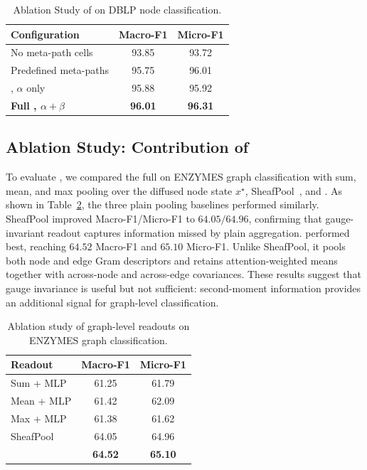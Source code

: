\begin{table}[t]
  \centering
  \caption{Ablation Study of \ampss{} on DBLP node classification.}
  \label{tab:ablation-schema}
  \small
  \begin{tabular}{lcc}
    \toprule
    \textbf{Configuration} & Macro-F1 & Micro-F1 \\
    \midrule
    No meta-path cells & 93.85 & 93.72 \\
    Predefined meta-paths & 95.75 & 96.01 \\
    \ampss{}, $\alpha$ only & 95.88 & 95.92 \\
    \textbf{Full \ampss{}, $\alpha+\beta$} & \textbf{96.01} & \textbf{96.31} \\
    \bottomrule
  \end{tabular}
\end{table}

\subsection{Ablation Study: Contribution of {\sheafcovpool{}}}

To evaluate \sheafcovpool{}, we compared the full \method{} on ENZYMES graph classification with sum, mean, and max pooling over the diffused node state \(x^\star\), SheafPool~\cite{braithwaite2024heterogeneous}, and \sheafcovpool{}. As shown in Table~\ref{tab:ablation-pooling}, the three plain pooling baselines performed similarly. SheafPool improved Macro-F1/Micro-F1 to \(64.05/64.96\), confirming that gauge-invariant readout captures information missed by plain aggregation. \sheafcovpool{} performed best, reaching \(64.52\) Macro-F1 and \(65.10\) Micro-F1. Unlike SheafPool, it pools both node and edge Gram descriptors and retains attention-weighted means together with across-node and across-edge covariances. These results suggest that gauge invariance is useful but not sufficient: second-moment information provides an additional signal for graph-level classification.

\begin{table}[t]
  \centering
  \caption{Ablation study of graph-level readouts on ENZYMES graph classification.}
  \label{tab:ablation-pooling}
  \small
  \begin{tabular}{lcc}
    \toprule
    \textbf{Readout} & Macro-F1 & Micro-F1 \\
    \midrule
    Sum + MLP & 61.25 & 61.79 \\
    Mean + MLP & 61.42 & 62.09 \\
    Max + MLP & 61.38 & 61.62 \\
    SheafPool & 64.05 & 64.96 \\
    \textbf{\sheafcovpool{}} & \textbf{64.52} & \textbf{65.10} \\
    \bottomrule
  \end{tabular}
\end{table}

